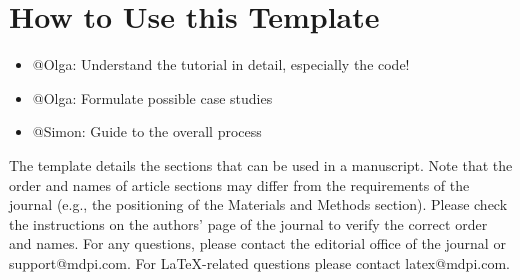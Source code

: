 \documentclass[journal,article,submit,pdftex,moreauthors]{Definitions/mdpi}
\begin{document}
\setcounter{section}{-1} %
\section{How to Use this Template}
\begin{itemize}
    \item @Olga: Understand the tutorial in detail, especially the code!
    \item @Olga: Formulate possible case studies
    \item @Simon: Guide to the overall process
\end{itemize}
The template details the sections that can be used in a manuscript. Note that the order and names of article sections may differ from the requirements of the journal (e.g., the positioning of the Materials and Methods section). Please check the instructions on the authors' page of the journal to verify the correct order and names. For any questions, please contact the editorial office of the journal or support@mdpi.com. For LaTeX-related questions please contact latex@mdpi.com.%

\end{document}
